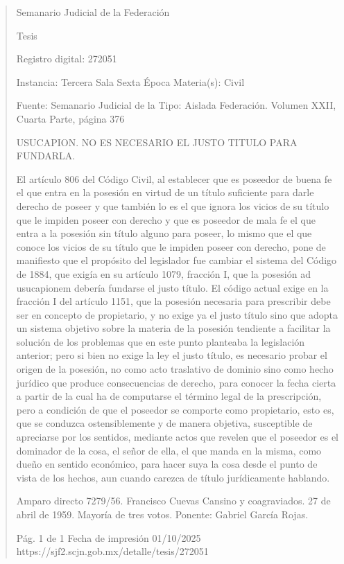 \documentclass[11pt,a4paper]{article}
\begin{document}
\begin{quote}
                                                   Semanario Judicial de la Federación

                                                  Tesis

 Registro digital: 272051

 Instancia: Tercera Sala           Sexta Época                            Materia(s): Civil

                                   Fuente: Semanario Judicial de la   Tipo: Aislada
                                   Federación.
                                   Volumen XXII, Cuarta Parte, página
                                   376


USUCAPION. NO ES NECESARIO EL JUSTO TITULO PARA FUNDARLA.


El artículo 806 del Código Civil, al establecer que es poseedor de buena fe el que entra en la
posesión en virtud de un título suficiente para darle derecho de poseer y que también lo es el que
ignora los vicios de su título que le impiden poseer con derecho y que es poseedor de mala fe el
que entra a la posesión sin título alguno para poseer, lo mismo que el que conoce los vicios de su
título que le impiden poseer con derecho, pone de manifiesto que el propósito del legislador fue
cambiar el sistema del Código de 1884, que exigía en su artículo 1079, fracción I, que la posesión
ad usucapionem debería fundarse el justo título. El código actual exige en la fracción I del artículo
1151, que la posesión necesaria para prescribir debe ser en concepto de propietario, y no exige ya
el justo título sino que adopta un sistema objetivo sobre la materia de la posesión tendiente a
facilitar la solución de los problemas que en este punto planteaba la legislación anterior; pero si bien
no exige la ley el justo título, es necesario probar el origen de la posesión, no como acto traslativo
de dominio sino como hecho jurídico que produce consecuencias de derecho, para conocer la fecha
cierta a partir de la cual ha de computarse el término legal de la prescripción, pero a condición de
que el poseedor se comporte como propietario, esto es, que se conduzca ostensiblemente y de
manera objetiva, susceptible de apreciarse por los sentidos, mediante actos que revelen que el
poseedor es el dominador de la cosa, el señor de ella, el que manda en la misma, como dueño en
sentido económico, para hacer suya la cosa desde el punto de vista de los hechos, aun cuando
carezca de título jurídicamente hablando.


Amparo directo 7279/56. Francisco Cuevas Cansino y coagraviados. 27 de abril de 1959. Mayoría
de tres votos. Ponente: Gabriel García Rojas.




                                              Pág. 1 de 1              Fecha de impresión 01/10/2025
  https://sjf2.scjn.gob.mx/detalle/tesis/272051

\end{quote}
\end{document}
